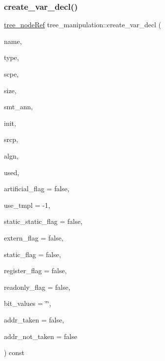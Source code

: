 \subsubsection{\texorpdfstring{create\+\_\+var\+\_\+decl()}{create\_var\_decl()}}
{\footnotesize\ttfamily \hyperlink{tree__node_8hpp_a6ee377554d1c4871ad66a337eaa67fd5}{tree\+\_\+node\+Ref} tree\+\_\+manipulation\+::create\+\_\+var\+\_\+decl (\begin{DoxyParamCaption}\item[{const \hyperlink{tree__node_8hpp_a6ee377554d1c4871ad66a337eaa67fd5}{tree\+\_\+node\+Ref} \&}]{name,  }\item[{const \hyperlink{tree__node_8hpp_a3cf5d02292c940f3892425a5b5fdec3c}{tree\+\_\+node\+Const\+Ref} \&}]{type,  }\item[{const \hyperlink{tree__node_8hpp_a6ee377554d1c4871ad66a337eaa67fd5}{tree\+\_\+node\+Ref} \&}]{scpe,  }\item[{const \hyperlink{tree__node_8hpp_a6ee377554d1c4871ad66a337eaa67fd5}{tree\+\_\+node\+Ref} \&}]{size,  }\item[{const \hyperlink{tree__node_8hpp_a6ee377554d1c4871ad66a337eaa67fd5}{tree\+\_\+node\+Ref} \&}]{smt\+\_\+ann,  }\item[{const \hyperlink{tree__node_8hpp_a6ee377554d1c4871ad66a337eaa67fd5}{tree\+\_\+node\+Ref} \&}]{init,  }\item[{const std\+::string \&}]{srcp,  }\item[{unsigned int}]{algn,  }\item[{int}]{used,  }\item[{bool}]{artificial\+\_\+flag = {\ttfamily false},  }\item[{int}]{use\+\_\+tmpl = {\ttfamily -\/1},  }\item[{bool}]{static\+\_\+static\+\_\+flag = {\ttfamily false},  }\item[{bool}]{extern\+\_\+flag = {\ttfamily false},  }\item[{bool}]{static\+\_\+flag = {\ttfamily false},  }\item[{bool}]{register\+\_\+flag = {\ttfamily false},  }\item[{bool}]{readonly\+\_\+flag = {\ttfamily false},  }\item[{const std\+::string \&}]{bit\+\_\+values = {\ttfamily \char`\"{}\char`\"{}},  }\item[{bool}]{addr\+\_\+taken = {\ttfamily false},  }\item[{bool}]{addr\+\_\+not\+\_\+taken = {\ttfamily false} }\end{DoxyParamCaption}) const}



